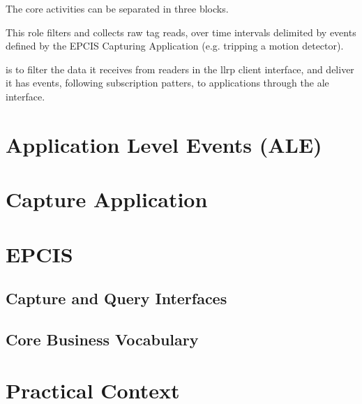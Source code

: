 The core activities can be separated in three blocks.


This role filters and collects raw tag reads, over time intervals delimited by events defined by the EPCIS Capturing Application (e.g. tripping a motion detector).

is to filter the data it receives from readers in the \ac{llrp} client interface, and deliver it has events, following subscription patters, to applications through the \ac{ale} interface.







\section{Application Level Events (ALE)}

\section{Capture Application}

\section{EPCIS}


\subsection{Capture and Query Interfaces}

\subsection{Core Business Vocabulary}

\section{Practical Context}


\cleardoublepage